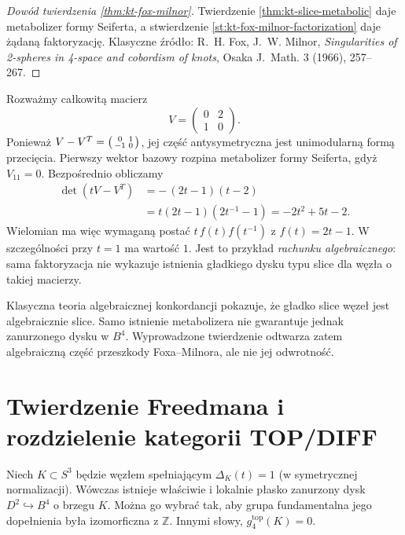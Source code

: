\begin{proof}[Dowód twierdzenia \ref{thm:kt-fox-milnor}]
Twierdzenie \ref{thm:kt-slice-metabolic} daje
metabolizer formy Seiferta, a stwierdzenie
\ref{st:kt-fox-milnor-factorization} daje żądaną
faktoryzację. Klasyczne źródło:
R.~H. Fox, J.~W. Milnor,
\emph{Singularities of 2-spheres in 4-space and cobordism of knots},
Osaka J.~Math. 3 (1966), 257--267.
\end{proof}

\begin{przyklad}
\label{ex:kt-fox-milnor-matrix}
Rozważmy całkowitą macierz
\[
V=\begin{pmatrix}0&2\\1&0\end{pmatrix}.
\]
Ponieważ
$V-V^T=\begin{psmallmatrix}0&1\\-1&0\end{psmallmatrix}$,
jej część antysymetryczna jest
unimodularną formą przecięcia.
Pierwszy wektor bazowy rozpina
metabolizer formy Seiferta, gdyż
$V_{11}=0$. Bezpośrednio obliczamy
\[
\begin{aligned}
\det(tV-V^T)
&=-\,(2t-1)(t-2)\\
&=t(2t-1)(2t^{-1}-1)
=-2t^2+5t-2.
\end{aligned}
\]
Wielomian ma więc wymaganą postać
$t\,f(t)f(t^{-1})$ z $f(t)=2t-1$.
W szczególności przy $t=1$ ma wartość $1$.
Jest to przykład \emph{rachunku algebraicznego}:
sama faktoryzacja nie wykazuje istnienia
gładkiego dysku typu slice dla węzła
o takiej macierzy.
\end{przyklad}

\begin{uwaga}
Klasyczna teoria algebraicznej konkordancji pokazuje,
że gładko slice węzeł jest algebraicznie slice.
Samo istnienie metabolizera nie gwarantuje jednak
zanurzonego dysku w $B^4$. Wyprowadzone twierdzenie
odtwarza zatem algebraiczną część przeszkody Foxa--Milnora,
ale nie jej odwrotność.
\end{uwaga}


\section{Twierdzenie Freedmana i rozdzielenie kategorii TOP/DIFF}
\label{sec:kt-freedman}

\begin{twierdzenie}
\label{thm:kt-freedman-slice}
Niech $K\subset S^3$ będzie węzłem spełniającym
$\Delta_K(t)=1$ (w symetrycznej normalizacji).
Wówczas istnieje właściwie i lokalnie płasko
zanurzony dysk $D^2\hookrightarrow B^4$ o brzegu $K$.
Można go wybrać tak, aby grupa fundamentalna jego
dopełnienia była izomorficzna z $\mathbb Z$. Innymi słowy,
$g_4^{\mathrm{top}}(K)=0$.
\end{twierdzenie}

